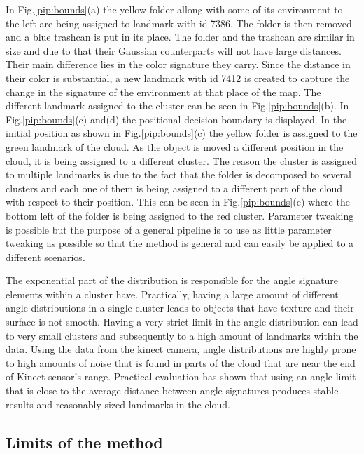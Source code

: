 \documentclass[twoside,hidelinks]{article}
\begin{document}
In Fig.\ref{pip:bounds}(a) the yellow folder allong with some of its environment to the left are being assigned to landmark with id 7386. The folder is then removed and a blue trashcan is put in its place. The folder and the trashcan are similar in size and due to that their Gaussian counterparts will not have large distances. Their main difference lies in the color signature they carry. Since the distance in their color is substantial, a new landmark with id 7412 is created to capture the change in the signature of the environment at that place of the map. The different landmark assigned to the cluster can be seen in Fig.\ref{pip:bounds}(b). In Fig.\ref{pip:bounds}(c) and(d) the positional decision boundary is displayed. In the initial position as shown in Fig.\ref{pip:bounds}(c) the yellow folder is assigned to the green landmark of the cloud. As the object is moved a different position in the cloud, it is being assigned to a different cluster. The reason the cluster is assigned to multiple landmarks is due to the fact that the folder is decomposed to several clusters and each one of them is being assigned to a different part of the cloud with respect to their position. This can be seen in Fig.\ref{pip:bounds}(c) where the bottom left of the folder is being assigned to the red cluster. Parameter tweaking is possible but the purpose of a general pipeline is to use as little parameter tweaking as possible so that the method is general and can easily be applied to a different scenarios.

The exponential part of the distribution is responsible for the angle signature elements within a cluster have. Practically, having a large amount of different angle distributions in a single cluster leads to objects that have texture and their surface is not smooth. Having a very strict limit in the angle distribution can lead to very small clusters and subsequently to a high amount of landmarks within the data. Using the data from the kinect camera, angle distributions are highly prone to high amounts of noise that is found in parts of the cloud that are near the end of Kinect sensor's range. Practical evaluation has shown that using an angle limit that is close to the average distance between angle signatures produces stable results and reasonably sized landmarks in the cloud.


\subsection{Limits of the method}
\end{document}
